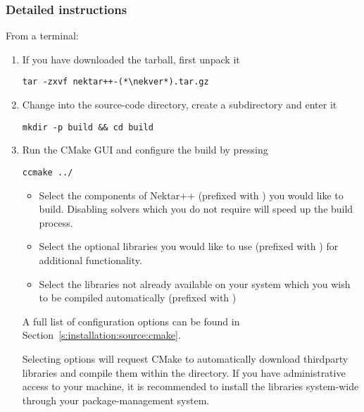 \subsubsection{Detailed instructions}
From a terminal:
\begin{enumerate}
    \item If you have downloaded the tarball, first unpack it
    \begin{lstlisting}[style=BashInputStyle]
tar -zxvf nektar++-(*\nekver*).tar.gz
    \end{lstlisting}

    \item Change into the source-code directory, create a 
    subdirectory and enter it
    \begin{lstlisting}[style=BashInputStyle]
    mkdir -p build && cd build
    \end{lstlisting}

    \item Run the CMake GUI and configure the build by pressing 
    \begin{lstlisting}[style=BashInputStyle]
    ccmake ../
    \end{lstlisting}
    \begin{itemize}
        \item Select the components of Nektar++ (prefixed with
        ) you would like to build. Disabling solvers
        which you do not require will speed up the build process.
        \item Select the optional libraries you would like to use (prefixed with
        ) for additional functionality.
        \item Select the libraries not already available on your system which
        you wish to be compiled automatically (prefixed with
        )
    \end{itemize}
    A full list of configuration options can be found in
    Section~\ref{s:installation:source:cmake}.

    \begin{notebox}
    Selecting  options will request CMake to
    automatically download thirdparty libraries and compile them within the
    \nekpp directory. If you have administrative access to your machine, it is
    recommended to install the libraries system-wide through your
    package-management system.
    \end{notebox}



\end{enumerate}
